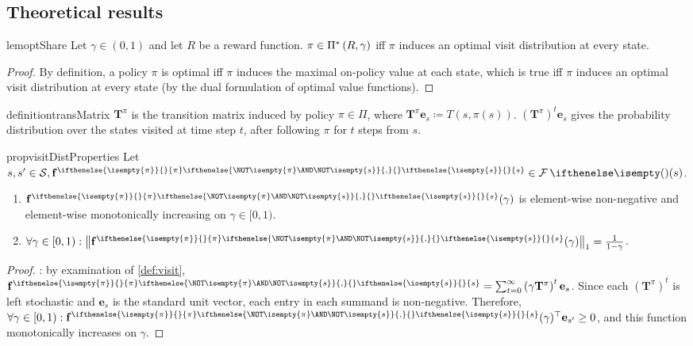 \documentclass{article}
\newcommand*{\prn}[1]{\left(#1\right)}
\newcommand*{\defeq}{\coloneqq} %
\newcommand*{\unitvec}[1][s]{\mathbf{e}_{#1}}
\newcommand*{\St}{\mathcal{S}}
\newcommand*{\optPi}{\piSet[*]}
\newcommand*{\f}{\mathbf{f}} %
\newcommand*{\fpi}[2][\pi]{\f^{
\ifthenelse{\isempty{#1}}{}{#1} %
\ifthenelse{\NOT\isempty{#1} \AND \NOT\isempty{#2}}{,}{} %
\ifthenelse{\isempty{#2}}{}{#2}}} %
\newcommand*{\lone}[1]{\left \lVert#1\right \rVert_1}
\newcommand*{\geom}[1][1]{\frac{#1}{1-\gamma}}
\theoremstyle{definition}
\begin{document}
\begin{appendices}
\section{Theoretical results} \label{app:proofs}
\begin{restatable}{lem}{optShare}\label{lem:opt-pol-visit-iff}
Let $\gamma \in (0,1)$ and let $R$ be a reward function. $\pi \in \optPi$ iff $\pi$ induces an optimal visit distribution at every state. 
\end{restatable}
\begin{proof}
By definition, a policy $\pi$ is optimal iff $\pi$ induces the maximal on-policy value at each state, which is true iff $\pi$ induces an optimal visit distribution at every state (by the dual formulation of optimal value functions). 
\end{proof}

\begin{restatable}{definition}{transMatrix}\label{def:trans-matrix}
$\mathbf{T}^\pi$ is the transition matrix induced by policy $\pi \in \Pi$, where $\mathbf{T}^\pi\unitvec \defeq T(s,\pi(s))$. $(\mathbf{T}^\pi)^t \unitvec$ gives the probability distribution over the states visited at time step $t$, after following $\pi$ for $t$ steps from $s$.
\end{restatable} 

\begin{restatable}{prop}{visitDistProperties}\label{prop:visit-dist-prop} 
Let $s,s'\in\St,\fpi{s} \in \F(s)$. 
\begin{enumerate}
    \item $\fpi{s}(\gamma)$ is element-wise non-negative and element-wise monotonically increasing on $\gamma\in[0,1)$. \label{item:mono-increase}
    \item $\forall \gamma \in [0,1): \lone{\fpi{s}(\gamma)}=\geom$.\label{item:lone-visit}
\end{enumerate}
\end{restatable}
\begin{proof}
: by examination of \cref{def:visit}, $\fpi{s} = \sum_{t=0}^\infty \prn{\gamma\mathbf{T}^\pi}^t\unitvec$. Since each $\prn{\mathbf{T}^\pi}^t$ is left stochastic and $\unitvec$ is the standard unit vector, each entry in each summand is non-negative. Therefore, $\forall \gamma \in [0,1): \fpi{s}(\gamma)^\top \unitvec[s']\geq 0$, and this function monotonically increases on $\gamma$.


\end{proof}
\end{appendices}
\end{document}

